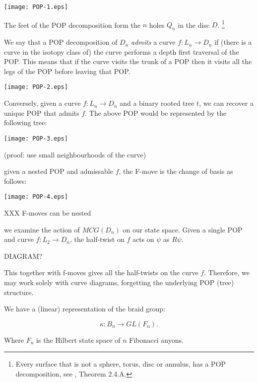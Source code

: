 \documentclass[11pt,a4paper]{article}
\begin{document}
\begin{center}
\texttt{[image: POP-1.eps]}
\end{center}

The feet of the POP decomposition form the $n$ holes $Q_n$ in the disc $D$.
\footnote{Every surface that is not a sphere, torus, disc or annulus, has
a POP decomposition, see \cite{Ivanov01}, Theorem 2.4.A.}

We say that a POP decomposition of $D_n$
{\it admits} a curve $f:L_n\to D_n$
if (there is a curve in the isotopy class of)
the curve performs a depth first traversal of the POP.
This means that if the curve visits the trunk of a POP
then it visits all the legs of the POP before leaving that POP.

\begin{center}
\texttt{[image: POP-2.eps]}
\end{center}

Conversely, given a curve $f:L_n\to D_n$
and a binary rooted tree $t$,
we can recover a unique POP that admits $f$.
The above POP would be represented by the following tree:

\begin{center}
\texttt{[image: POP-3.eps]}
\end{center}

(proof: use small neighbourhoods of the curve)

 given a nested POP and admissable $f$,
the F-move is the change of basis as follows:

\begin{center}
\texttt{[image: POP-4.eps]}
\end{center}

XXX F-moves can be nested

 we examine the action of $MCG(D_n)$
on our state space. Given a single POP and curve $f:L_2\to D_n$,
the half-twist on $f$ acts on $\psi$ as $R\psi$.

DIAGRAM?

This together with f-moves gives all the half-twists on
the curve $f$. Therefore, we may work solely with curve
diagrams, forgetting the underlying POP (tree) structure.

We have a (linear) representation of the braid group:

    $$ \kappa : B_n \to GL(F_n).$$

Where $F_n$ is the Hilbert state space of $n$ Fibonacci anyons.
\end{document}
